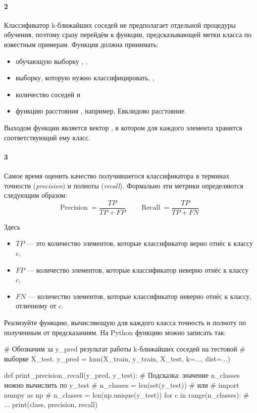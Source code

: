 \documentclass[a4paper,12pt]{article}
\begin{document}
\paragraph{2} Классификатор k-ближайших соседей не предполагает отдельной
процедуры обучения, поэтому сразу перейдём к функции, предсказывающей метки
класса по известным примерам. Функция  должна принимать:
\begin{itemize}
\item обучающую выборку , ,
\item выборку, которую нужно классифицировать, ,
\item количество соседей  и
\item функцию расстояния , например, Евклидово расстояние.
\end{itemize}

Выходом функции является вектор , в котором для каждого
элемента  хранится соответствующий ему класс.

\clearpage

\paragraph{3} Самое время оценить качество получившегося классификатора в
терминах точности (\emph{precision}) и полноты (\emph{recall}). Формально эти
метрики определяются следующим образом:
$$
\operatorname{Precision} = \frac{TP}{TP + FP}
\qquad
\operatorname{Recall} = \frac{TP}{TP + FN}
$$

Здесь
\begin{itemize}
\item $TP$ --- это количество элементов, которые классификатор верно отнёс к классу $c$,
\item $FP$ --- количество элементов, которые классификатор неверно отнёс к классу $c$,
\item $FN$ --- количество элементов, которые классификатор неверно отнёс к классу, отличному от $c$.
\end{itemize}

Реализуйте функцию, вычисляющую для каждого класса точность и полноту по
полученным от  предсказаниям. На Python функцию можно записать
так:
\begin{python3}
# Обозначим за y_pred результат работы k-ближайших соседей на тестовой
# выборке X_test.
y_pred = knn(X_train, y_train, X_test, k=..., dist=...)

def print_precision_recall(y_pred, y_test):
    # Подсказка: значение n_classes можно вычислить по y_test
    #     n_classes = len(set(y_test))
    # или
    #     import numpy as np
    #     n_classes = len(np.unique(y_test))
    for c in range(n_classes):
        # ...
        print(class, precision, recall)
\end{python3}
\end{document}

